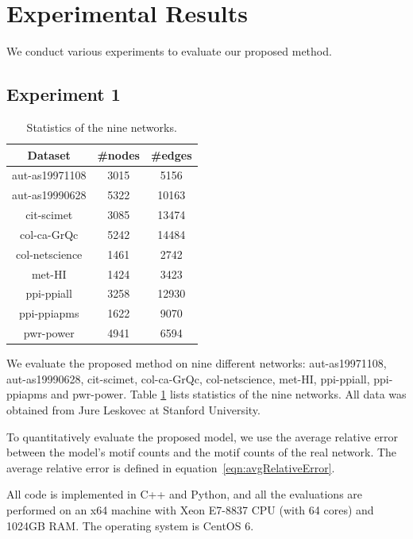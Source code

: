 \section{Experimental Results}
\label{sec:exp}

We conduct various experiments to evaluate our proposed method.

\subsection{Experiment 1}

\begin{table}[t]
\centering
\begin{tabular}{|c|c@{ }|c@{ }|}
\hline
Dataset             &   \#nodes       &   \#edges \\ \hline
aut-as19971108 & 3015 & 5156 \\\hline
aut-as19990628 & 5322 & 10163 \\\hline
cit-scimet & 3085 & 13474 \\\hline
col-ca-GrQc & 5242 & 14484 \\\hline
col-netscience & 1461 & 2742 \\\hline
met-HI & 1424 & 3423 \\\hline
ppi-ppiall & 3258 & 12930 \\\hline
ppi-ppiapms & 1622 & 9070 \\\hline
pwr-power & 4941 & 6594 \\\hline
\end{tabular}
\caption{Statistics of the nine networks.}
\label{tb:statistics}
\end{table}


 We evaluate the proposed method on nine different networks: aut-as19971108, aut-as19990628, cit-scimet, col-ca-GrQc, col-netscience, met-HI, ppi-ppiall, ppi-ppiapms and pwr-power.
Table \ref{tb:statistics} lists statistics of the nine networks.  All data was obtained from Jure Leskovec at Stanford University.

 To quantitatively evaluate the proposed model, we use the average relative error between the model's motif counts and the motif counts of the real network.  The average relative error is defined in equation~\ref{eqn:avgRelativeError}.

All code is implemented in C++ and Python, and all the evaluations are performed on an x64 machine with Xeon E7-8837 CPU (with 64 cores) and 1024GB RAM. The operating system is CentOS 6. 

